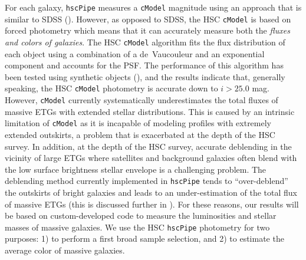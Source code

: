 \documentclass[a4paper,fleqn,usenatbib]{mnras}
\def\cmodel{\texttt{cModel}}
\begin{document}
    For each galaxy, \texttt{hscPipe} measures a \cmodel{} magnitude using an approach 
    that is similar to SDSS (\citealt{Bosch2017}). 
    However, as opposed to SDSS, the HSC \cmodel{} is based on forced photometry which 
    means that it can accurately measure both the \textit{fluxes and colors of galaxies}. 
    The HSC \cmodel{} algorithm fits the flux distribution of each object using a 
    combination of a de~Vaucouleur and an exponential component and accounts for the PSF. 
    The performance of this algorithm has been tested using synthetic objects 
    (\citealt{SynPipe}), and the results indicate that, generally speaking, 
    the HSC \cmodel{} photometry is accurate down to $i >25.0$ mag.  
    However, \cmodel{} currently systematically underestimates the total fluxes of 
    massive ETGs with extended stellar distributions. 
    This is caused by an intrinsic limitation of \cmodel{} as it is incapable of
    modeling profiles with extremely extended outskirts, a problem that is exacerbated 
    at the depth of the HSC survey. 
    In addition, at the depth of the HSC survey, accurate deblending in the vicinity of
    large ETGs where satellites and background galaxies often blend with the low surface 
    brightness stellar envelope is a challenging problem. 
    The deblending method currently implemented in \texttt{hscPipe} tends to 
    ``over-deblend'' the outskirts of bright galaxies and leads to an 
    under-estimation of the total flux of massive ETGs (this is discussed further in 
    \citealt{Bosch2017}).  
    For these reasons, our results will be based on custom-developed code to measure 
    the luminosities and stellar masses of massive galaxies. 
    We use the HSC \texttt{hscPipe} photometry for two purposes: 
    1) to perform a first broad sample selection, and 2) to estimate the average 
    color of massive galaxies.
\end{document}
